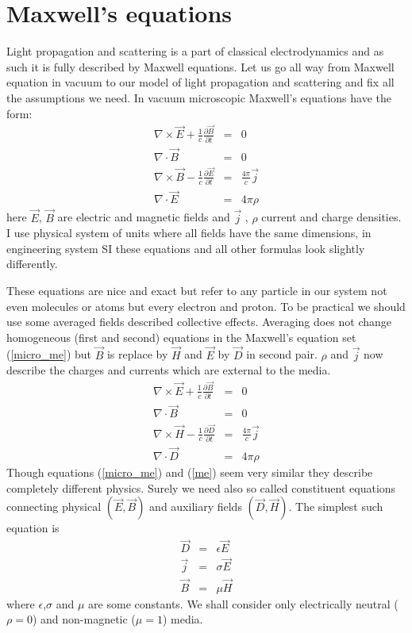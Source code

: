 \documentclass[12pt]{article}
\begin{document}
\section{Maxwell's equations}
Light propagation and scattering is a part of classical electrodynamics and as such it is fully described by Maxwell equations. Let us go all way from Maxwell equation in vacuum to our model of light propagation and scattering and fix all the assumptions we need.
In vacuum microscopic Maxwell's equations have the form:
\begin{eqnarray}
	\nabla \times \vec E +\frac{1}{c} \frac{\partial \vec B}{\partial t} &=& 0 \nonumber\\
	\nabla \cdot \vec B &=&0 \nonumber\\
	\nabla \times \vec B -\frac{1}{c} \frac{\partial \vec E}{\partial t} &=& \frac{4\pi}{c} \vec j \nonumber \\
	\nabla \cdot \vec E &=&4\pi \rho \label {micro_me}
\end{eqnarray}
here $\vec E$, $\vec B$ are electric and magnetic fields and $\vec j$ , $\rho$ current and charge densities. I use physical system of units where all fields have the same dimensions, in engineering system SI these equations and all other formulas look slightly differently.

These equations are nice and exact but refer to any particle in our system not even molecules or atoms but every electron and proton. To be practical we should use some averaged fields described collective effects. Averaging does not change homogeneous (first and second) equations in the Maxwell's equation set (\ref{micro_me}) but $\vec B$ is replace by $\vec H$ and $\vec E$ by $\vec D$ in second pair. $\rho$ and $\vec j$ now describe the charges and currents which are external  to the media.
\begin{eqnarray}
	\nabla \times \vec E +\frac{1}{c} \frac{\partial \vec B}{\partial t} &=& 0 \nonumber\\
	\nabla \cdot \vec B &=&0 \nonumber\\
	\nabla \times \vec H -\frac{1}{c} \frac{\partial \vec D}{\partial t} &=& \frac{4\pi}{c} \vec j \nonumber \\
	\nabla \cdot \vec D &=&4\pi \rho \label {me}
\end{eqnarray}
Though equations (\ref{micro_me}) and (\ref{me}) seem very similar they describe completely different physics. Surely we need also so called constituent  equations connecting physical $(\vec E,\vec B)$ and auxiliary fields $(\vec D,\vec H)$. The simplest such equation is 
\begin{eqnarray}
	\vec D&=& \epsilon \vec E \nonumber \\
	\vec j&=& \sigma \vec E \nonumber \\
	\vec B&=& \mu \vec H \label{simple_ce}
\end{eqnarray}
where $\epsilon$,$\sigma$ and $\mu$ are some constants. We shall consider only electrically neutral  ($\rho=0$) and non-magnetic ($\mu=1$) media.
\end{document}
